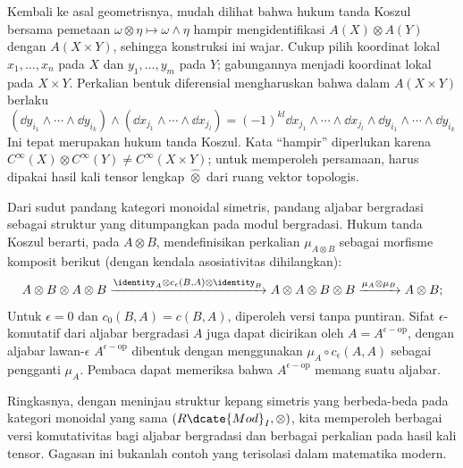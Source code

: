 Kembali ke asal geometrisnya, mudah dilihat bahwa hukum tanda Koszul bersama pemetaan $\omega \otimes \eta \mapsto \omega \wedge \eta$ hampir mengidentifikasi $A(X) \otimes A(Y)$ dengan $A(X \times Y)$, sehingga konstruksi ini wajar. Cukup pilih koordinat lokal $x_1, \ldots, x_n$ pada $X$ dan $y_1, \ldots, y_m$ pada $Y$; gabungannya menjadi koordinat lokal pada $X \times Y$. Perkalian bentuk diferensial mengharuskan bahwa dalam $A(X \times Y)$ berlaku
\[ \left( \dd y_{i_1} \wedge \cdots \wedge \dd y_{i_k} \right) \wedge \left( \dd  x_{j_1} \wedge \cdots \wedge \dd x_{j_l} \right) = (-1)^{kl} \dd x_{j_1} \wedge \cdots \wedge \dd x_{j_l} \wedge \dd y_{i_1} \wedge \cdots \wedge \dd y_{i_k} \]
Ini tepat merupakan hukum tanda Koszul. Kata ``hampir'' diperlukan karena $C^\infty(X) \otimes C^\infty(Y) \neq C^\infty(X \times Y)$; untuk memperoleh persamaan, harus dipakai hasil kali tensor lengkap $\hat{\otimes}$ dari ruang vektor topologis.

Dari sudut pandang kategori monoidal simetris, pandang aljabar bergradasi sebagai struktur yang ditumpangkan pada modul bergradasi. Hukum tanda Koszul berarti, pada $A \otimes B$, mendefinisikan perkalian $\mu_{A \otimes B}$ sebagai morfisme komposit berikut (dengan kendala asosiativitas dihilangkan):
\[ A \otimes B \otimes A \otimes B \xrightarrow{\identity_A \otimes c_\epsilon(B, A) \otimes \identity_B} A \otimes A \otimes B \otimes B \xrightarrow{\mu_A \otimes \mu_B} A \otimes B; \]
Untuk $\epsilon=0$ dan $c_0(B,A) = c(B, A)$, diperoleh versi tanpa puntiran. Sifat $\epsilon$-komutatif dari aljabar bergradasi $A$ juga dapat dicirikan oleh $A = A^{\epsilon-\text{op}}$, dengan aljabar lawan-$\epsilon$ $A^{\epsilon-\text{op}}$ dibentuk dengan menggunakan $\mu_A \circ c_\epsilon(A,A)$ sebagai pengganti $\mu_A$. Pembaca dapat memeriksa bahwa $A^{\epsilon-\text{op}}$ memang suatu aljabar.

Ringkasnya, dengan meninjau struktur kepang simetris yang berbeda-beda pada kategori monoidal yang sama $(R\dcate{Mod}_I, \otimes)$, kita memperoleh berbagai versi komutativitas bagi aljabar bergradasi dan berbagai perkalian pada hasil kali tensor. Gagasan ini bukanlah contoh yang terisolasi dalam matematika modern.

